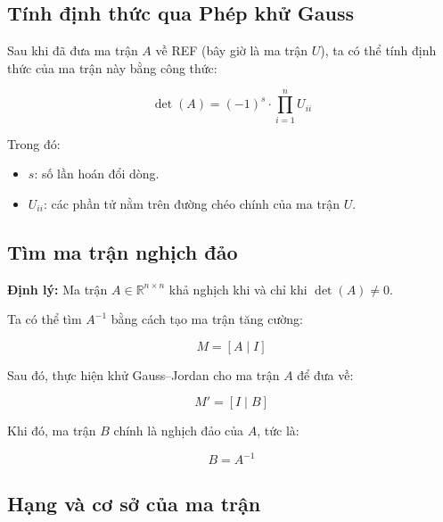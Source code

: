 \documentclass[a4paper,12pt]{report}
\begin{document}
\subsection{Tính định thức qua Phép khử Gauss}

Sau khi đã đưa ma trận $A$ về REF (bây giờ là ma trận $U$), ta có thể tính định thức của ma trận này bằng công thức:

\[
\det(A)=(-1)^s \cdot \prod_{i=1}^{n} U_{ii}
\]

Trong đó:

\begin{itemize}
    \item $s$: số lần hoán đổi dòng.
    \item $U_{ii}$: các phần tử nằm trên đường chéo chính của ma trận $U$.
\end{itemize}

\subsection{Tìm ma trận nghịch đảo}

\textbf{Định lý:} Ma trận $A \in \mathbb{R}^{n \times n}$ khả nghịch khi và chỉ khi $\det(A) \neq 0$.

Ta có thể tìm $A^{-1}$ bằng cách tạo ma trận tăng cường:

\[
M = [A \mid I]
\]

Sau đó, thực hiện khử Gauss--Jordan cho ma trận $A$ để đưa về:

\[
M' = [I \mid B]
\]

Khi đó, ma trận $B$ chính là nghịch đảo của $A$, tức là:

\[
B = A^{-1}
\]

\subsection{Hạng và cơ sở của ma trận}
\end{document}
